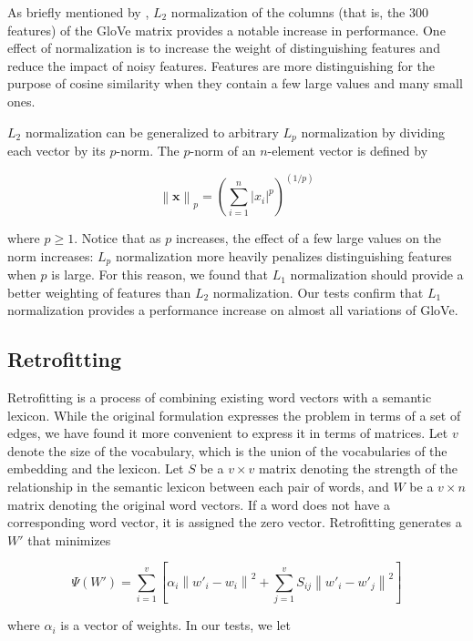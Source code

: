 \documentclass[11pt,letterpaper]{article}
\begin{document}
As briefly mentioned by , $L_2$ normalization of
the columns (that is, the 300 features) of the GloVe matrix provides a notable
increase in performance. One effect of normalization is to increase the weight
of distinguishing features and reduce the impact of noisy features.  Features
are more distinguishing for the purpose of cosine similarity when they contain
a few large values and many small ones.

$L_2$ normalization can be generalized to arbitrary $L_p$ normalization by
dividing each vector by its $p$-norm. The $p$-norm of an $n$-element vector is
defined by

$$ \left\|\mathbf{x}\right\|_p
= \left(\sum_{i=1}^n \left|x_i\right|^p\right)^{(1/p)}$$

where $p \geq 1$. Notice that as $p$ increases, the effect of a few large values
on the norm increases: $L_p$ normalization more heavily penalizes
distinguishing features when $p$ is large. For this reason, we found that $L_1$
normalization should provide a better weighting of features than $L_2$
normalization.  Our tests confirm that $L_1$ normalization provides a
performance increase on almost all variations of GloVe.


\subsection{Retrofitting}

Retrofitting \cite{faruqui2015retrofitting} is a process of combining existing
word vectors with a semantic lexicon. While the original formulation expresses
the problem in terms of a set of edges, we have found it more convenient to
express it in terms of matrices. Let $v$ denote the size of the vocabulary,
which is the union of the vocabularies of the embedding and the lexicon. Let $S$ be
a $v \times v$ matrix denoting the strength of the relationship in the semantic lexicon
between each pair of words, and $W$ be a $v \times n$
matrix denoting the original word vectors. If a word does not have a
corresponding word vector, it is assigned the zero vector. Retrofitting
generates a $W'$ that minimizes

\begin{small}
$$
\Psi \left( W' \right) = \sum_{i=1}^v \left[
  \alpha_i \left\|  w'_i - w_i \right\| ^ 2
  + \sum_{j=1}^v S_{ij} \left\| w'_i - w'_j \right\| ^ 2
\right]
$$
\end{small}

where $\alpha_i$ is a vector of weights. In our tests, we let
\end{document}
